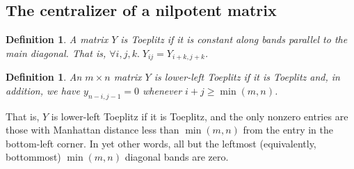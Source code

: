 \documentclass[12pt,psamsfonts]{article}
\newtheorem{definition}[theorem]{Definition}
\begin{document}
\subsection{The centralizer of a nilpotent matrix}
\begin{definition}
    A matrix \(Y\) is \emph{Toeplitz} if it is constant along bands parallel to the main diagonal.
    That is, \(\forall i,j,k. \; Y_{ij} = Y_{i + k, j + k}\).
\end{definition}
\begin{definition}
    An \(m \times n\) matrix \(Y\) is \emph{lower-left Toeplitz} if it is Toeplitz and, in addition, we have \(y_{n - i, j - 1} = 0\) whenever \(i + j \geq \min(m,n)\).
\end{definition}
That is, \(Y\) is lower-left Toeplitz if it is Toeplitz, and the only nonzero entries are those with Manhattan distance less than \(\min(m,n)\) from the entry in the bottom-left corner.
In yet other words, all but the leftmost (equivalently, bottommost) \(\min(m,n)\) diagonal bands are zero.
\end{document}
